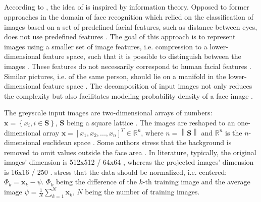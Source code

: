 \subsection{\eigenfaces{}}\label{subsec:eigenface}

According to \citeauthor{eigenfaces1991}, the idea of \eigenfaces{} is inspired by information theory.
Opposed to former approaches in the domain of face recognition which relied on the classification of images based on a set of predefined facial features, such as distance between eyes,
\eigenfaces{} does not use predefined features \cite{eigenfaces1991}.
The goal of this approach is to represent images using a smaller set of image features, i.e. compression to a lower-dimensional feature space, 
such that it is possible to distinguish between the images \cite{eigenfaces1991, eigenfaces2013}.
These features do not necessarily correspond to human facial features \cite{eigenfaces1991}.
Similar pictures, i.e. of the same person, should lie on a manifold in the lower-dimensional feature space \cite{face-recognition2008}.
The decomposition of input images not only reduces the complexity but also facilitates modeling probability density of a face image \cite{face-recognition2008}.

The greyscale input images are two-dimensional arrays of numbers: $\textbf{x} = \left\{ x_i, i \in \textbf{S} \right\}$, $\textbf{S}$ being a square lattice \cite{eigenfaces1997, eigenfaces1991}.
The images are reshaped to an one-dimensional array $\textbf{x} = \left[x_1, x_2, ..., x_n  \right]^{T} \in \mathbb{R}^{n}$, 
where $n = \left\| \textbf{S} \right\|$ and $\mathbb{R}^{n}$ is the $n$-dimensional euclidean space \cite{eigenfaces1997}.
Some authors stress that the background is removed to omit values outside the face area \cite{eigenfaces1991}.
In literature, typically, the original images' dimension is 512x512 \cite{eigenfaces1991}/ 64x64 \cite{face-recognition2020}, 
whereas the projected images' dimension is 16x16 \cite{eigenfaces1991}/ 250 \cite{face-recognition2020}.
\citeauthor{eigenfaces1991} stress that the data should be normalized, i.e. centered: 
$\Phi_{k} = \mathbf{x}_{k} - {\psi }$. 
$\Phi_{k}$ being the difference of the $k$-th training image and the average image $\psi = \frac{1}{N}\sum_{k=1}^{N}\textbf{x}_{k}$, $N$ being the number of training images.

